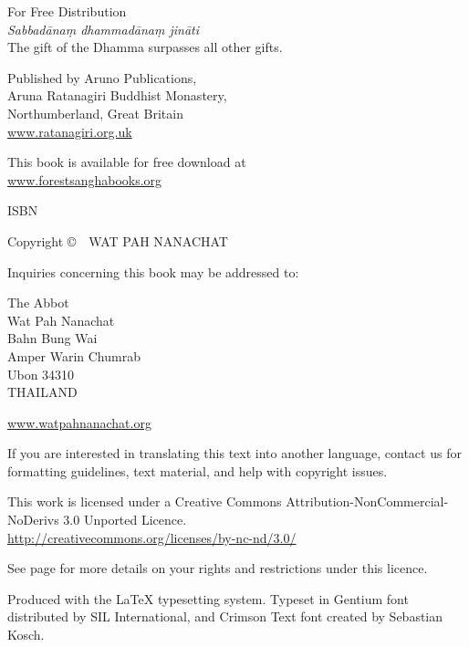 \cleartoverso
\thispagestyle{empty}
{\small\setlength{\parskip}{0.8em}\setlength{\parindent}{0em}%
{\raggedright%

\thetitle

For Free Distribution\\
\emph{Sabbadānaṃ dhammadānaṃ jināti}\\
The gift of the Dhamma surpasses all other gifts.

Published by Aruno Publications,\\
Aruna Ratanagiri Buddhist Monastery,\\
Northumberland, Great Britain\\
\href{http://ratanagiri.org.uk/}{www.ratanagiri.org.uk}

This book is available for free download at\\
\href{http://forestsanghabooks.org/}{www.forestsanghabooks.org}

ISBN \theISBN

Copyright \copyright\ \the\year\ WAT PAH NANACHAT

Inquiries concerning this book may be addressed to:

The Abbot\\
Wat Pah Nanachat\\
Bahn Bung Wai\\
Amper Warin Chumrab\\
Ubon 34310\\
THAILAND

\href{http://www.watpahnanachat.org/}{www.watpahnanachat.org}

\vfill

{\footnotesize
If you are interested in translating this text into another language, contact us for formatting guidelines, text material, and help with copyright issues.

This work is licensed under a Creative Commons Attribution-NonCommercial-NoDerivs 3.0 Unported Licence.\\
\href{http://creativecommons.org/licenses/by-nc-nd/3.0/}{http://creativecommons.org/licenses/by-nc-nd/3.0/}

See page \pageref{copyright-details} for more details on your rights and restrictions under this licence.

Produced with the {\selectfont\LaTeX} typesetting system. Typeset in Gentium font distributed by SIL International, and Crimson Text font created by Sebastian Kosch.

\theEditionInfo

}

}}

